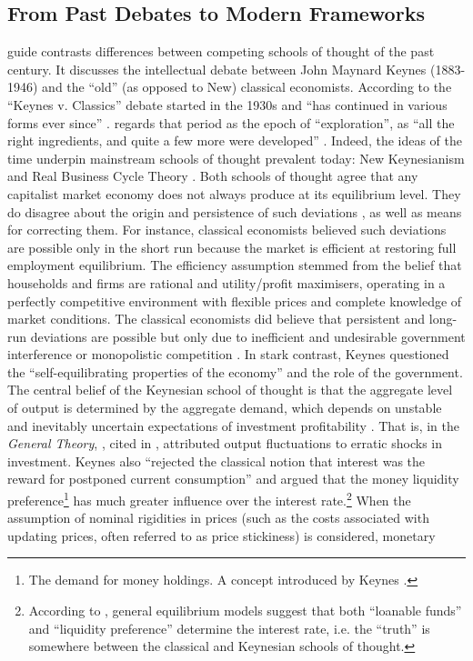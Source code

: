 \subsection{From Past Debates to Modern Frameworks}
\textcite{snowdon_1994_a} guide contrasts differences between competing schools of thought of the past century. It discusses the intellectual debate between John Maynard Keynes (1883-1946) and the ``old'' (as opposed to New) classical economists. According to \citereset\textcite[42]{snowdon_1994_a} the ``Keynes v. Classics'' debate started in the 1930s and ``has continued in various forms ever since'' \parencite[42]{snowdon_1994_a}. \textcite{blanchard_2000_what} regards that period as the epoch of ``exploration'', as ``all the right ingredients, and quite a few more were developed'' \parencite[1376]{blanchard_2000_what}. Indeed, the ideas of the time underpin mainstream schools of thought prevalent today: New Keynesianism and Real Business Cycle Theory \parencites[1]{jordigal_2015_monetary}[42]{snowdon_1994_a}. Both schools of thought agree that any capitalist market economy does not always produce at its equilibrium level. They do disagree about the origin and persistence of such deviations \parencite[43]{snowdon_1994_a}, as well as means for correcting them. For instance, classical economists believed such deviations are possible only in the short run because the market is efficient at restoring full employment equilibrium. The efficiency assumption stemmed from the belief that households and firms are rational and utility/profit maximisers, operating in a perfectly competitive environment with flexible prices and complete knowledge of market conditions. The classical economists did believe that persistent and long-run deviations are possible but only due to inefficient and undesirable government interference or monopolistic competition \parencite[43]{snowdon_1994_a}. In stark contrast, Keynes questioned the ``self-equilibrating properties of the economy'' \parencite[89]{snowdon_1994_a} and the role of the government. The central belief of the Keynesian school of thought is that the aggregate level of output is determined by the aggregate demand, which depends on unstable and inevitably uncertain expectations of investment profitability \parencite[65]{snowdon_1994_a}. That is, in the \textit{General Theory}, \textcite{keynes_1936_general}, cited in \citereset\textcite[65]{snowdon_1994_a}, attributed output fluctuations to erratic shocks in investment. Keynes also ``rejected the classical notion that interest was the reward for postponed current consumption'' \parencite[66]{snowdon_1994_a} and argued that the money liquidity preference\footnote{The demand for money holdings. A concept introduced by Keynes \parencite[66]{snowdon_1994_a}.} has much greater influence over the interest rate.\footnote{According to \textcite[1380]{blanchard_2000_what}, general equilibrium models suggest that both ``loanable funds'' and ``liquidity preference'' determine the interest rate, i.e. the ``truth'' is somewhere between the classical and Keynesian schools of thought.} When the assumption of nominal rigidities in prices (such as the costs associated with updating prices, often referred to as price stickiness) is considered, monetary 